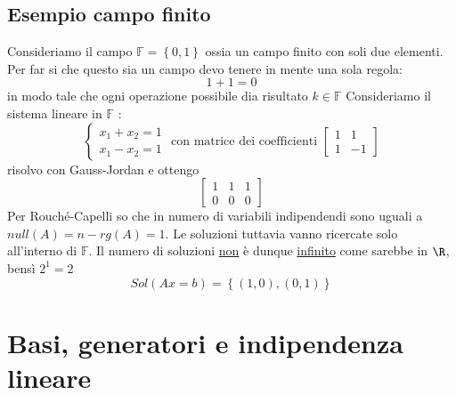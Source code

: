\subsection{Esempio campo finito}
Consideriamo il campo $ \mathbb{F}=\left\{ 0,1 \right\} $ ossia un campo finito con soli due elementi. Per far si che questo sia un campo devo tenere in mente una sola regola:
\[
	1+1=0
\]
in modo tale che ogni operazione possibile dia risultato $k \in  \mathbb{F}$
\vskip3mm
Consideriamo il sistema lineare in $ \mathbb{F}$ :
\[
	\begin{cases}
		x_1+x_2=1 \\
		x_1-x_2=1
	\end{cases}
	\text{ con matrice dei coefficienti }
	\begin{bmatrix}
		1 & 1  \\
		1 & -1
	\end{bmatrix}
\]
risolvo con Gauss-Jordan e ottengo
\[
	\begin{bmatrix}
		1 & 1 & 1 \\
		0 & 0 & 0
	\end{bmatrix}
\]
Per Rouché-Capelli so che in numero di variabili indipendendi sono uguali a $null\left( A \right) = n-rg\left( A \right) = 1$. Le soluzioni tuttavia vanno ricercate solo all'interno di $ \mathbb{F}$. Il numero di soluzioni \underline{non} è dunque \underline{infinito} come sarebbe in $\R$, bensì $2^{1}=2$
\[
	Sol\left( Ax=b \right) = \left\{ \left( 1,0 \right) , \left( 0,1 \right)  \right\}
\]

\section{Basi, generatori e indipendenza lineare}

